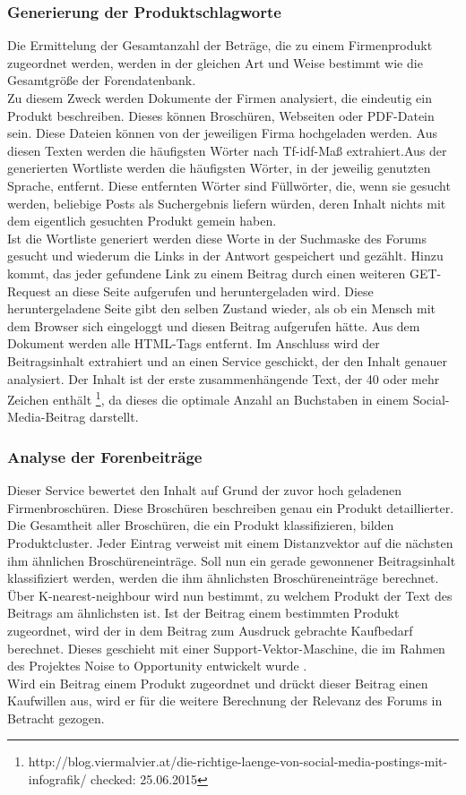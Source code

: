 \subsubsection{Generierung der Produktschlagworte}
Die Ermittelung der Gesamtanzahl der Beträge, die zu einem Firmenprodukt zugeordnet werden, werden in der gleichen Art und Weise bestimmt wie die Gesamtgröße der Forendatenbank.\\
Zu diesem Zweck werden Dokumente der Firmen analysiert, die eindeutig ein Produkt beschreiben. Dieses können Broschüren, Webseiten oder PDF-Datein sein. Diese Dateien können von der jeweiligen Firma hochgeladen werden. Aus diesen Texten werden die häufigsten Wörter nach Tf-idf-Maß extrahiert.Aus der generierten Wortliste werden die häufigsten Wörter, in der jeweilig genutzten Sprache, entfernt. Diese entfernten Wörter sind Füllwörter, die, wenn sie gesucht werden, beliebige Posts als Suchergebnis liefern würden, deren Inhalt nichts mit dem eigentlich gesuchten Produkt gemein haben.\\
Ist die Wortliste generiert werden diese Worte in der Suchmaske des Forums gesucht und wiederum die Links in der Antwort gespeichert und gezählt. Hinzu kommt, das jeder gefundene Link zu einem Beitrag durch einen weiteren GET-Request an diese Seite aufgerufen und heruntergeladen wird. Diese heruntergeladene Seite gibt den selben Zustand wieder, als ob ein Mensch mit dem Browser sich eingeloggt und diesen Beitrag aufgerufen hätte. Aus dem Dokument werden alle HTML-Tags entfernt. Im Anschluss wird der Beitragsinhalt extrahiert und an einen Service geschickt, der den Inhalt genauer analysiert. Der Inhalt ist der erste zusammenhängende Text, der 40 oder mehr Zeichen enthält \footnote{http://blog.viermalvier.at/die-richtige-laenge-von-social-media-postings-mit-infografik/ checked: 25.06.2015}, da dieses die optimale Anzahl an Buchstaben in einem Social- Media-Beitrag darstellt.

\subsubsection{Analyse der Forenbeiträge}
Dieser Service bewertet den Inhalt auf Grund der zuvor hoch geladenen Firmenbroschüren. Diese Broschüren beschreiben genau ein Produkt detaillierter. Die Gesamtheit aller Broschüren, die ein Produkt klassifizieren, bilden Produktcluster. Jeder Eintrag verweist mit einem Distanzvektor auf die nächsten ihm ähnlichen Broschüreneinträge. Soll nun ein gerade gewonnener Beitragsinhalt klassifiziert werden, werden die ihm ähnlichsten Broschüreneinträge berechnet. Über K-nearest-neighbour wird nun bestimmt, zu welchem Produkt der Text des Beitrags am ähnlichsten ist. Ist der Beitrag einem bestimmten Produkt zugeordnet, wird der in dem Beitrag zum Ausdruck gebrachte Kaufbedarf berechnet. Dieses geschieht mit einer Support-Vektor-Maschine, die im Rahmen des Projektes Noise to Opportunity entwickelt wurde \cite{n2o}.\\
Wird ein Beitrag einem Produkt zugeordnet und drückt dieser Beitrag einen Kaufwillen aus, wird er für die weitere Berechnung der Relevanz des Forums in Betracht gezogen.

